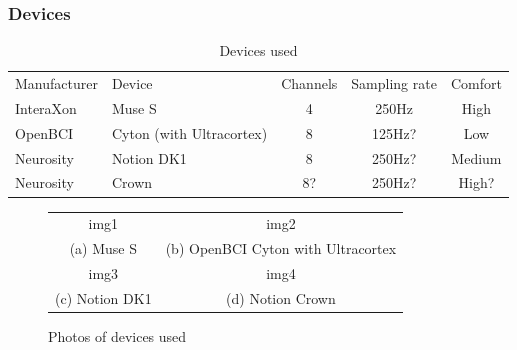 \documentclass[a4paper]{article}
\begin{document}
\begin{refsection}

        \subsubsection{Devices}


            \begin{center}
                \begin{table}
                \begin{tabular}{llccc}
                    Manufacturer
                    & Device
                    & Channels
                    & Sampling rate
                    & Comfort
                    \\
                    InteraXon
                    & Muse S
                    & 4
                    & 250Hz
                    & High \\
                 OpenBCI
                    & Cyton (with Ultracortex)
                    & 8
                    & 125Hz?
                    & Low \\
                 Neurosity
                    & Notion DK1
                    & 8
                    & 250Hz?
                    & Medium \\
                  Neurosity
                    & Crown
                    & 8?
                    & 250Hz?
                    & High? \\
                \end{tabular}
                \caption{Devices used}
                \end{table}
            \end{center}

            \begin{center}
            \begin{figure}
                \begin{tabular}{cc}
                    img1 %
                    & img2 %
                    \\
                    (a) Muse S
                    & (b) OpenBCI Cyton with Ultracortex
                    \\[6pt]
                    img3 %
                    & img4 %
                    \\
                    (c) Notion DK1
                    & (d) Notion Crown
                    \\[6pt]
                \end{tabular}
                \caption{Photos of devices used}
            \end{figure}
            \end{center}


\end{refsection}
\end{document}
